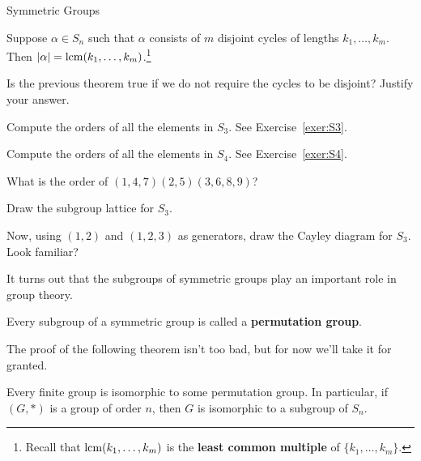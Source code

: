\begin{section}{Symmetric Groups}
\begin{theorem}
Suppose \(\alpha\in S_n\) such that \(\alpha\) consists of \(m\) disjoint cycles of lengths \(k_1,\ldots, k_m\).  Then \(|\alpha|=\operatorname{lcm}(k_1,\ldots, k_m)\).\footnote{Recall that \(\operatorname{lcm}(k_1,\ldots, k_m)\) is the \textbf{least common multiple} of \(\{k_1,\ldots, k_m\}\).} 
\end{theorem}

\begin{problem}
Is the previous theorem true if we do not require the cycles to be disjoint?  Justify your answer.
\end{problem}

\begin{exercise}
Compute the orders of all the elements in \(S_3\).  See Exercise~\ref{exer:S3}.
\end{exercise}

\begin{exercise}
Compute the orders of all the elements in \(S_4\).  See Exercise~\ref{exer:S4}.
\end{exercise}

\begin{exercise}
What is the order of \((1,4,7)(2,5)(3,6,8,9)\)?
\end{exercise}

\begin{exercise}
Draw the subgroup lattice for \(S_3\).
\end{exercise}

\begin{exercise}
Now, using \((1,2)\) and \((1,2,3)\) as generators, draw the Cayley diagram for \(S_3\).  Look familiar?
\end{exercise}

It turns out that the subgroups of symmetric groups play an important role in group theory.

\begin{definition}
Every subgroup of a symmetric group is called a \textbf{permutation group}.
\end{definition}

The proof of the following theorem isn't too bad, but for now we'll take it for granted.

\begin{theorem}
Every finite group is isomorphic to some permutation group.  In particular, if \((G,*)\) is a group of order \(n\), then \(G\) is isomorphic to a subgroup of \(S_n\).
\end{theorem}


\end{section}
